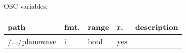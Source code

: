 \begin{snugshade}
{\footnotesize
\label{osctab:receivermodwfs}
OSC variables:
\nopagebreak

\begin{tabularx}{\textwidth}{llllX}
\hline
path & fmt. & range & r. & description\\
\hline
/.../planewave & i & bool & yes & \\
\hline
\end{tabularx}
}
\end{snugshade}
